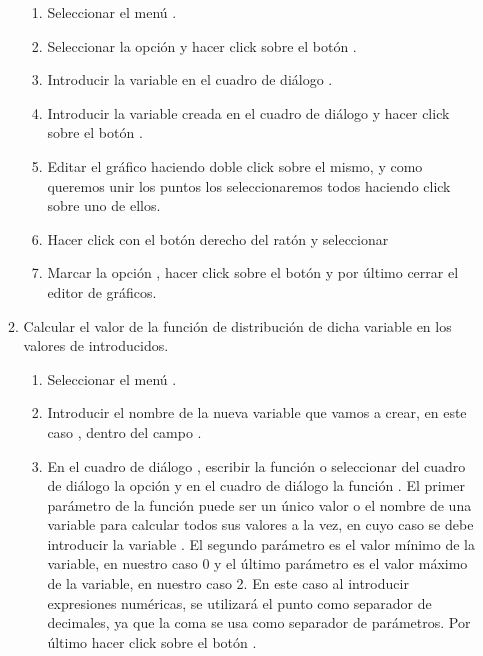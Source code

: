 \begin{enumerate}[leftmargin=*]
\begin{enumerate}
\begin{indicacion}
\begin{enumerate}
\item Seleccionar el menú .
\item Seleccionar la opción  y hacer click sobre el 
botón .
\item Introducir la variable  en el cuadro de diálogo 
.
\item Introducir la variable creada  en el cuadro 
de diálogo  y hacer click sobre el botón .
\item Editar el gráfico haciendo doble click sobre el mismo, y como 
queremos unir los puntos los seleccionaremos todos
haciendo click sobre uno de ellos.
\item Hacer click con el botón derecho del ratón y seleccionar 
\item Marcar la opción , hacer click sobre el botón 
 y por último cerrar el editor de gráficos.
\end{enumerate}
\end{indicacion}

\item  Calcular el valor de la función de distribución de dicha variable 
en los valores de  introducidos.

\begin{indicacion}
\begin{enumerate}
\item Seleccionar el menú .
\item Introducir el nombre de la nueva variable que vamos a crear, 
en este caso , dentro del campo 
.

\item En el cuadro de diálogo , escribir la 
función  o seleccionar del cuadro de 
diálogo  la opción  y en el 
cuadro de diálogo  la 
función . El primer parámetro de la función 
 puede ser un único valor o el nombre 
de una variable para calcular todos sus valores a la vez, en cuyo caso 
se debe introducir la variable .
El segundo parámetro es el valor mínimo de la variable, en nuestro 
caso 0 y el último parámetro es el valor máximo de
la variable, en nuestro caso 2. En este caso al introducir expresiones 
numéricas, se utilizará el punto como separador de decimales, ya que la 
coma se usa como separador de parámetros. Por último hacer click sobre 
el botón .
\end{enumerate}
\end{indicacion}


\end{enumerate}
\end{enumerate}
